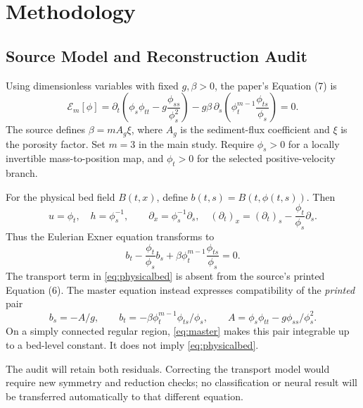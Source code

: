 \documentclass[12pt,a4paper]{article}
\begin{document}
\newpage
\section{Methodology}
\subsection{Source Model and Reconstruction Audit}
Using dimensionless variables with fixed $g,\beta>0$, the paper's Equation (7) is
\begin{equation}
\mathcal E_m[\phi]=
\partial_t\left(\phi_s\phi_{tt}-g\frac{\phi_{ss}}{\phi_s^2}\right)
-g\beta\,\partial_s\left(\phi_t^{m-1}\frac{\phi_{ts}}{\phi_s}\right)=0.
\label{eq:master}
\end{equation}
The source defines $\beta=mA_g\xi$, where $A_g$ is the sediment-flux coefficient and $\xi$ is the porosity factor. Set $m=3$ in the main study. Require $\phi_s>0$ for a locally invertible mass-to-position map, and $\phi_t>0$ for the selected positive-velocity branch.

For the physical bed field $B(t,x)$, define $b(t,s)=B(t,\phi(t,s))$. Then
\[
u=\phi_t,\quad h=\phi_s^{-1},\qquad
\partial_x=\phi_s^{-1}\partial_s,\quad
(\partial_t)_x=(\partial_t)_s-\frac{\phi_t}{\phi_s}\partial_s.
\]
Thus the Eulerian Exner equation transforms to
\begin{equation}
b_t-\frac{\phi_t}{\phi_s}b_s+
\beta\phi_t^{m-1}\frac{\phi_{ts}}{\phi_s}=0.
\label{eq:physicalbed}
\end{equation}
The transport term in \eqref{eq:physicalbed} is absent from the source's printed Equation (6). The master equation instead expresses compatibility of the \emph{printed} pair
\[
b_s=-A/g,\qquad b_t=-\beta\phi_t^{m-1}\phi_{ts}/\phi_s,\qquad
A=\phi_s\phi_{tt}-g\phi_{ss}/\phi_s^2.
\]
On a simply connected regular region, \eqref{eq:master} makes this pair integrable up to a bed-level constant. It does not imply \eqref{eq:physicalbed}.

The audit will retain both residuals. Correcting the transport model would require new symmetry and reduction checks; no classification or neural result will be transferred automatically to that different equation.

\newpage
\end{document}
